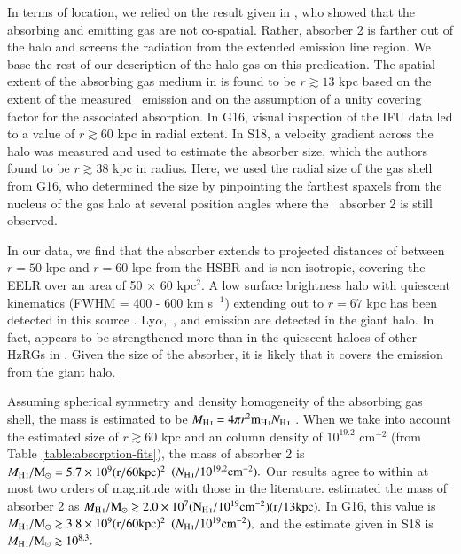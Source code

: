 In terms of location, we relied on the result given in \citet{binette2000}, who showed that the absorbing and emitting gas are not co-spatial. Rather, absorber 2 is farther out of the halo and screens the radiation from the extended emission line region. We base the rest of our description of the halo gas on this predication. The spatial extent of the absorbing  gas medium in \citet{rottgering1995} is found to be $r \gtrsim 13$ kpc based on the extent of the measured \lya~emission and on the assumption of a unity covering factor for the associated absorption. In G16, visual inspection of the IFU data led to a value of $r \gtrsim 60$ kpc in radial extent. In S18, a velocity gradient across the halo was measured and used to estimate the absorber size, which the authors found to be $r \gtrsim 38$ kpc in radius. Here, we used the radial size of the  gas shell from G16, who determined the size by pinpointing the farthest spaxels from the nucleus of the gas halo at several position angles where the \lya~absorber 2 is still observed. 

In our data, we find that the absorber extends to projected distances of between $r = 50$ kpc and $r = 60$ kpc from the HSBR and is non-isotropic, covering the EELR over an area of 50 $\times$ 60 kpc$^{2}.$ A low surface brightness halo with quiescent kinematics (FWHM = 400 - 600 km s$^{-1}$) extending out to $r = 67$ kpc has been detected in this source \citep[e.g.][]{villar-martin2003}. Ly$\alpha,$ ,  and  emission are detected in the giant halo. In fact,  appears to be strengthened more than in the quiescent haloes of other HzRGs in \citet{villar-martin2003}. Given the size of the absorber, it is likely that it covers the emission from the giant halo. 

Assuming spherical symmetry and density homogeneity of the absorbing gas shell, the  mass is estimated to be $M_\ion{H}{I} = 4 \pi r^2 {\rm m}_\ion{H}{I} N_\ion{H}{I}$ \citep{deBreuck2003,humphrey2008b}. When we take into account the estimated size of $r \gtrsim 60$ kpc and an  column density of $10^{19.2}$ cm$^{-2}$ (from Table \ref{table:absorption-fits}), the  mass of absorber 2 is $M_\ion{H}{I}/\rm{M}_\odot = 5.7\e{9} (r / 60 {\rm kpc})^2$ $(N_\ion{H}{I} / 10^{19.2} {\rm cm}^{-2}).$ Our results agree to within at most two orders of magnitude with those in the literature. \citet{rottgering1995} estimated the mass of absorber 2  as $ M_\ion{H}{I}/\rm{M}_\odot \gtrsim 2.0\e{7} (N_\ion{H}{I} / 10^{19} {\rm cm}^{-2})(r / 13 {\rm kpc}).$ In G16, this value is $M_\ion{H}{I}/\rm{M}_\odot \gtrsim 3.8\e{9}(r / 60 {\rm kpc})^2$ $(N_\ion{H}{I} / 10^{19} {\rm cm}^{-2}), $ and the estimate given in S18 is $M_\ion{H}{I}/\rm{M}_\odot \gtrsim 10^{8.3}.$


